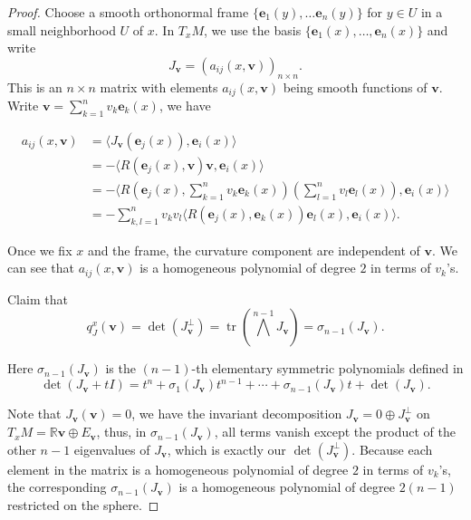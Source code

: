 \documentclass[reqno,11pt]{article}
\theoremstyle{definition}
\theoremstyle{remark}
\numberwithin{equation}{section}
\begin{document}
\begin{proof}
	Choose a smooth orthonormal frame $\{\bm{e}_1(y),\ldots\bm{e}_n(y)\}$ for $y\in U$ in a small neighborhood $U$ of $x$. In $T_{x}M$, we use the basis $\{\bm{e}_1(x),\dots,\bm{e}_{n}(x)\}$ and write
	\begin{displaymath}
		J_{\bm{v}}={(a_{ij}(x,\bm{v}))}_{n\times n}.
	\end{displaymath}
	This is an $n\times n$ matrix with elements $a_{ij}(x,\bm{v})$ being smooth functions of $\bm{v}$. Write $\bm{v}=\sum_{k=1}^n v_k\bm{e}_{k}(x)$, we have

	\begin{displaymath}
		\begin{aligned}
			a_{ij}(x,\bm{v}) & =\langle J_{\bm{v}}(\bm{e}_j(x)),\bm{e}_{i}(x) \rangle                                                        \\
			                 & =-\langle R(\bm{e}_{j}(x),\bm{v})\bm{v},\bm{e}_{i}(x)\rangle                                                  \\
			                 & =-\langle R(\bm{e}_{j}(x),\sum_{k=1}^n v_k\bm{e}_{k}(x))(\sum_{l=1}^{n}v_l\bm{e}_{l}(x)),\bm{e}_{i}(x)\rangle \\
			                 & =-\sum_{k,l=1}^{n} v_k v_l\langle R(\bm{e}_{j}(x),\bm{e}_{k}(x))\bm{e}_{l}(x),\bm{e}_{i}(x)\rangle.
		\end{aligned}
	\end{displaymath}

	Once we fix $x$ and the frame, the curvature component are independent of $\bm{v}$. We can see that $a_{ij}(x,\bm{v})$ is a homogeneous polynomial of degree $2$ in terms of $v_k$'s.

	Claim that
	\begin{equation}
		q_{J}^{x}(\bm{v})=\det (J_{\bm{v}}^{\perp})=\operatorname{tr}(\bigwedge^{n-1}J_{\bm{v}})=\sigma_{n-1}(J_{\bm{v}}).
	\end{equation}

	Here $\sigma_{n-1}(J_{\bm{v}})$ is the $(n-1)$-th elementary symmetric polynomials defined in
	\begin{displaymath}
		\det(J_{\bm{v}}+t I)=t^n+\sigma_1(J_{\bm{v}})t^{n-1}+\cdots+\sigma_{n-1}(J_{\bm{v}})t+\det(J_{\bm{v}}).
	\end{displaymath}

	Note that $J_{\bm{v}}(\bm{v})=0$, we have the invariant decomposition $J_{\bm{v}}=0\oplus J^{\perp}_{\bm{v}}$ on $T_{x}M=\mathbb{R}\bm{v}\oplus E_{\bm{v}}$, thus, in $\sigma_{n-1}(J_{\bm{v}})$, all terms vanish except the product of the other $n-1$ eigenvalues of $J_{\bm{v}}$, which is exactly our $\det(J^{\perp}_{\bm{v}})$. Because each element in the matrix is a homogeneous polynomial of degree $2$ in terms of $v_{k}$'s, the corresponding $\sigma_{n-1}(J_{\bm{v}})$ is a homogeneous polynomial of degree $2(n-1)$ restricted on the sphere.
\end{proof}
\end{document}
